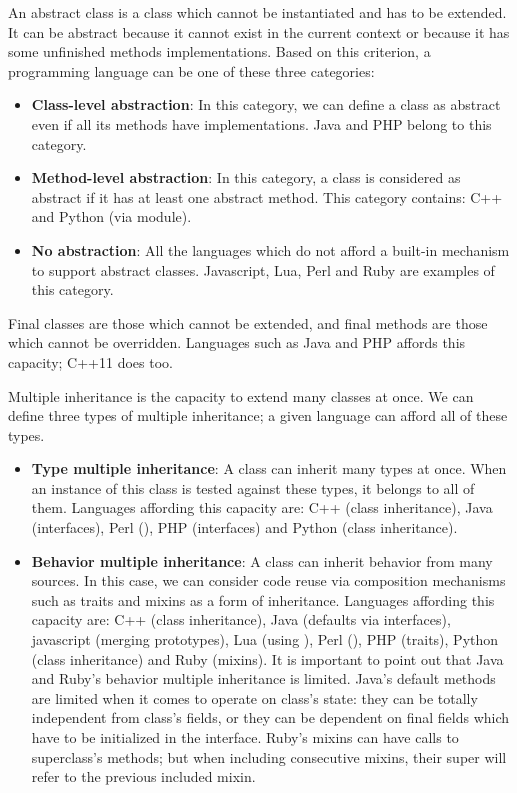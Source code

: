 \documentclass{KodeBook}
\begin{document}
\begin{discussion}
An abstract class is a class which cannot be instantiated and has to be extended. 
It can be abstract because it cannot exist in the current context or because it has some unfinished methods implementations. 
Based on this criterion, a programming language can be one of these three categories:
\begin{itemize}
	\item \textbf{Class-level abstraction}: In this category, we can define a class as abstract even if all its methods have implementations.
	Java and PHP belong to this category.
	\item \textbf{Method-level abstraction}: In this category, a class is considered as abstract if it has at least one abstract method.
	This category contains: C++ and Python (via  module).
	\item \textbf{No abstraction}: All the languages which do not afford a built-in mechanism to support abstract classes. 
	Javascript, Lua, Perl and Ruby are examples of this category.
\end{itemize}

Final classes are those which cannot be extended, and final methods are those which cannot be overridden. 
Languages such as Java and PHP affords this capacity; C++11 does too. 

Multiple inheritance is the capacity to extend many classes at once. 
We can define three types of multiple inheritance; a given language can afford all of these types.
\begin{itemize}
	\item \textbf{Type multiple inheritance}: A class can inherit many types at once.  
	When an instance of this class is tested against these types, it belongs to all of them. 
	Languages affording this capacity are: C++ (class inheritance), Java (interfaces), Perl (), PHP (interfaces) and Python (class inheritance).
	
	\item \textbf{Behavior multiple inheritance}: A class can inherit behavior from many sources. 
	In this case, we can consider code reuse via composition mechanisms such as traits and mixins as a form of inheritance. 
	Languages affording this capacity are: C++ (class inheritance), Java (defaults via interfaces), javascript (merging prototypes), Lua (using ), Perl (), PHP (traits), Python (class inheritance) and Ruby (mixins). 
	It is important to point out that Java and Ruby's behavior multiple inheritance is limited. 
	Java's default methods are limited when it comes to operate on class's state: they can be totally independent from class's fields, or they can be dependent on final fields which have to be initialized in the interface. 
	Ruby's mixins can have calls to superclass's methods; but when including consecutive mixins, their super will refer to the previous included mixin.
	

\end{itemize}
\end{discussion}
\end{document}
